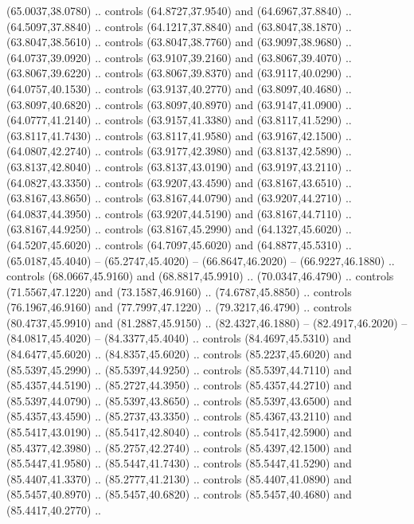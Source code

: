\begin{scope}[cm={{1.25,0.0,0.0,-1.25,(-71.74049,81.13304)}}]
        (65.0037,38.0780) .. controls (64.8727,37.9540) and (64.6967,37.8840) ..
        (64.5097,37.8840) .. controls (64.1217,37.8840) and (63.8047,38.1870) ..
        (63.8047,38.5610) .. controls (63.8047,38.7760) and (63.9097,38.9680) ..
        (64.0737,39.0920) .. controls (63.9107,39.2160) and (63.8067,39.4070) ..
        (63.8067,39.6220) .. controls (63.8067,39.8370) and (63.9117,40.0290) ..
        (64.0757,40.1530) .. controls (63.9137,40.2770) and (63.8097,40.4680) ..
        (63.8097,40.6820) .. controls (63.8097,40.8970) and (63.9147,41.0900) ..
        (64.0777,41.2140) .. controls (63.9157,41.3380) and (63.8117,41.5290) ..
        (63.8117,41.7430) .. controls (63.8117,41.9580) and (63.9167,42.1500) ..
        (64.0807,42.2740) .. controls (63.9177,42.3980) and (63.8137,42.5890) ..
        (63.8137,42.8040) .. controls (63.8137,43.0190) and (63.9197,43.2110) ..
        (64.0827,43.3350) .. controls (63.9207,43.4590) and (63.8167,43.6510) ..
        (63.8167,43.8650) .. controls (63.8167,44.0790) and (63.9207,44.2710) ..
        (64.0837,44.3950) .. controls (63.9207,44.5190) and (63.8167,44.7110) ..
        (63.8167,44.9250) .. controls (63.8167,45.2990) and (64.1327,45.6020) ..
        (64.5207,45.6020) .. controls (64.7097,45.6020) and (64.8877,45.5310) ..
        (65.0187,45.4040) -- (65.2747,45.4020) -- (66.8647,46.2020) --
        (66.9227,46.1880) .. controls (68.0667,45.9160) and (68.8817,45.9910) ..
        (70.0347,46.4790) .. controls (71.5567,47.1220) and (73.1587,46.9160) ..
        (74.6787,45.8850) .. controls (76.1967,46.9160) and (77.7997,47.1220) ..
        (79.3217,46.4790) .. controls (80.4737,45.9910) and (81.2887,45.9150) ..
        (82.4327,46.1880) -- (82.4917,46.2020) -- (84.0817,45.4020) --
        (84.3377,45.4040) .. controls (84.4697,45.5310) and (84.6477,45.6020) ..
        (84.8357,45.6020) .. controls (85.2237,45.6020) and (85.5397,45.2990) ..
        (85.5397,44.9250) .. controls (85.5397,44.7110) and (85.4357,44.5190) ..
        (85.2727,44.3950) .. controls (85.4357,44.2710) and (85.5397,44.0790) ..
        (85.5397,43.8650) .. controls (85.5397,43.6500) and (85.4357,43.4590) ..
        (85.2737,43.3350) .. controls (85.4367,43.2110) and (85.5417,43.0190) ..
        (85.5417,42.8040) .. controls (85.5417,42.5900) and (85.4377,42.3980) ..
        (85.2757,42.2740) .. controls (85.4397,42.1500) and (85.5447,41.9580) ..
        (85.5447,41.7430) .. controls (85.5447,41.5290) and (85.4407,41.3370) ..
        (85.2777,41.2130) .. controls (85.4407,41.0890) and (85.5457,40.8970) ..
        (85.5457,40.6820) .. controls (85.5457,40.4680) and (85.4417,40.2770) ..

\end{scope}
